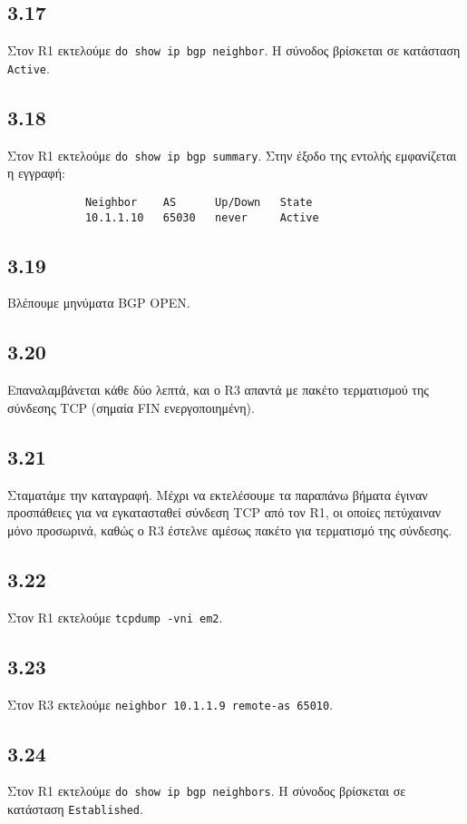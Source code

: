 \documentclass[a4paper, 12pt]{article}
\begin{document}
	\subsection*{3.17}
		Στον R1 εκτελούμε \verb|do show ip bgp neighbor|. Η σύνοδος βρίσκεται σε κατάσταση \verb|Active|.

	\subsection*{3.18}
		Στον R1 εκτελούμε \verb|do show ip bgp summary|. Στην έξοδο της εντολής εμφανίζεται η εγγραφή:
		
		\begin{verbatim}
			Neighbor    AS      Up/Down   State
			10.1.1.10   65030   never     Active
		\end{verbatim}

	\subsection*{3.19}
		Βλέπουμε μηνύματα BGP OPEN.

	\subsection*{3.20}
		Επαναλαμβάνεται κάθε δύο λεπτά, και ο R3 απαντά με πακέτο τερματισμού της σύνδεσης TCP (σημαία FIN ενεργοποιημένη). 

	\subsection*{3.21}
		Σταματάμε την καταγραφή. Μέχρι να εκτελέσουμε τα παραπάνω βήματα έγιναν προσπάθειες για να εγκατασταθεί σύνδεση TCP από τον R1, οι οποίες πετύχαιναν μόνο προσωρινά, καθώς ο R3 έστελνε αμέσως πακέτο για τερματισμό της σύνδεσης. 

	\subsection*{3.22}
		Στον R1 εκτελούμε \verb|tcpdump -vni em2|.

	\subsection*{3.23}
		Στον R3 εκτελούμε \verb|neighbor 10.1.1.9 remote-as 65010|.

	\subsection*{3.24}
		Στον R1 εκτελούμε \verb|do show ip bgp neighbors|. Η σύνοδος βρίσκεται σε κατάσταση \verb|Established|.
\end{document}
